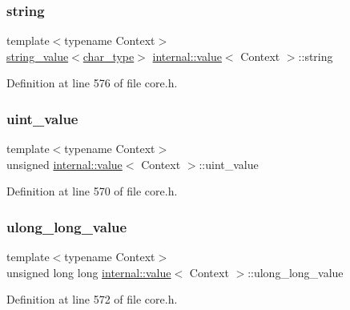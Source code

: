 \subsubsection{\texorpdfstring{string}{string}}
{\footnotesize\ttfamily template$<$typename Context$>$ \\
\hyperlink{structinternal_1_1string__value}{string\+\_\+value}$<$\hyperlink{classinternal_1_1value_aea7e71c59ab9961b645ed79e69aff80e}{char\+\_\+type}$>$ \hyperlink{classinternal_1_1value}{internal\+::value}$<$ Context $>$\+::string}



Definition at line 576 of file core.\+h.

\mbox{\label{classinternal_1_1value_a95277a7bf9ae00baa4b670d169a2d462}} 
\subsubsection{\texorpdfstring{uint\+\_\+value}{uint\_value}}
{\footnotesize\ttfamily template$<$typename Context$>$ \\
unsigned \hyperlink{classinternal_1_1value}{internal\+::value}$<$ Context $>$\+::uint\+\_\+value}



Definition at line 570 of file core.\+h.

\mbox{\label{classinternal_1_1value_ab4e3bdcbd82033eff1ed026e93d8fbc2}} 
\subsubsection{\texorpdfstring{ulong\+\_\+long\+\_\+value}{ulong\_long\_value}}
{\footnotesize\ttfamily template$<$typename Context$>$ \\
unsigned long long \hyperlink{classinternal_1_1value}{internal\+::value}$<$ Context $>$\+::ulong\+\_\+long\+\_\+value}



Definition at line 572 of file core.\+h.

\mbox{\label{classinternal_1_1value_ae036559e2acba411ec237335f9c227d1}} 
